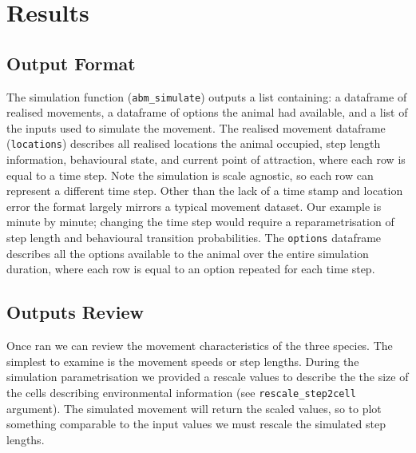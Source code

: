 \documentclass[10pt,a4paper]{article}
\begin{document}
\hypertarget{results}{%
\section{Results}\label{results}}

\hypertarget{output-format}{%
\subsection{Output Format}\label{output-format}}

The simulation function (\texttt{abm\_simulate}) outputs a list containing: a dataframe of realised movements, a dataframe of options the animal had available, and a list of the inputs used to simulate the movement.
The realised movement dataframe (\texttt{locations}) describes all realised locations the animal occupied, step length information, behavioural state, and current point of attraction, where each row is equal to a time step.
Note the simulation is scale agnostic, so each row can represent a different time step.
Other than the lack of a time stamp and location error the format largely mirrors a typical movement dataset.
Our example is minute by minute; changing the time step would require a reparametrisation of step length and behavioural transition probabilities.
The \texttt{options} dataframe describes all the options available to the animal over the entire simulation duration, where each row is equal to an option repeated for each time step.

\hypertarget{outputs-review}{%
\subsection{Outputs Review}\label{outputs-review}}

Once ran we can review the movement characteristics of the three species.
The simplest to examine is the movement speeds or step lengths.
During the simulation parametrisation we provided a rescale values to describe the the size of the cells describing environmental information (see \texttt{rescale\_step2cell} argument).
The simulated movement will return the scaled values, so to plot something comparable to the input values we must rescale the simulated step lengths.
\end{document}

